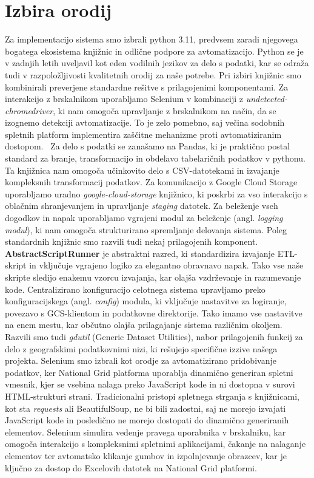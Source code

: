 \documentclass[a4paper,12pt,openright]{book}
\begin{document}
\section{Izbira orodij}

Za implementacijo sistema smo izbrali python 3.11, predvsem zaradi njegovega bogatega ekosistema knjižnic in odlične podpore za avtomatizacijo. Python se je v zadnjih letih uveljavil kot eden vodilnih jezikov za delo s podatki, kar se odraža tudi v razpoložljivosti kvalitetnih orodij za naše potrebe.
Pri izbiri knjižnic smo kombinirali preverjene standardne rešitve s prilagojenimi komponentami. Za interakcijo z brskalnikom uporabljamo Selenium v kombinaciji z \textit{undetected-chromedriver}, ki nam omogoča upravljanje z brskalnikom na način, da se izognemo detekciji avtomatizacije. To je zelo pomebno, saj večina sodobnih spletnih platform implementira zaščitne mehanizme proti avtomatiziranim dostopom.~\cite{10092327}
Za delo s podatki se zanašamo na Pandas, ki je praktično postal standard za branje, transformacijo in obdelavo tabelaričnih podatkov v pythonu. Ta knjižnica nam omogoča učinkovito delo s CSV-datotekami in izvajanje kompleksnih transformacij podatkov. Za komunikacijo z Google Cloud Storage uporabljamo uradno \textit{google-cloud-storage} knjižnico, ki poskrbi za vso interakcijo s oblačnim shranjevanjem in upravljanje \textit{staging} datotek.
Za beleženje vseh dogodkov in napak uporabljamo vgrajeni modul za beleženje (angl. \textit{logging modul}), ki nam omogoča strukturirano spremljanje delovanja sistema.
Poleg standardnih knjižnic smo razvili tudi nekaj prilagojenih komponent. \textbf{AbstractScriptRunner} je abstraktni razred, ki standardizira izvajanje ETL-skript in vključuje vgrajeno logiko za elegantno obravnavo napak. Tako vse naše skripte sledijo enakemu vzorcu izvajanja, kar olajša vzdrževanje in razumevanje kode.
Centralizirano konfiguracijo celotnega sistema upravljamo preko konfiguracijskega (angl. \textit{config}) modula, ki vključuje nastavitve za logiranje, povezavo s GCS-klientom in podatkovne direktorije. Tako imamo vse nastavitve na enem mestu, kar občutno olajša prilagajanje sistema različnim okoljem. Razvili smo tudi \textit{gdutil} (Generic Dataset Utilities), nabor prilagojenih funkcij za delo z geografskimi podatkovnimi nizi, ki rešujejo specifične izzive našega projekta.
Selenium smo izbrali kot orodje za avtomatizirano pridobivanje podatkov, ker National Grid platforma uporablja dinamično generiran spletni vmesnik, kjer se vsebina nalaga preko JavaScript kode in ni dostopna v surovi HTML-strukturi strani. Tradicionalni pristopi spletnega strganja s knjižnicami, kot sta \textit{requests} ali BeautifulSoup, ne bi bili zadostni, saj ne morejo izvajati JavaScript kode in posledično ne morejo dostopati do dinamično generiranih elementov. Selenium simulira vedenje pravega uporabnika v brskalniku, kar omogoča interakcijo s kompleksnimi spletnimi aplikacijami, čakanje na nalaganje elementov ter avtomatsko klikanje gumbov in izpolnjevanje obrazcev, kar je ključno za dostop do Excelovih datotek na National Grid platformi.
\end{document}
